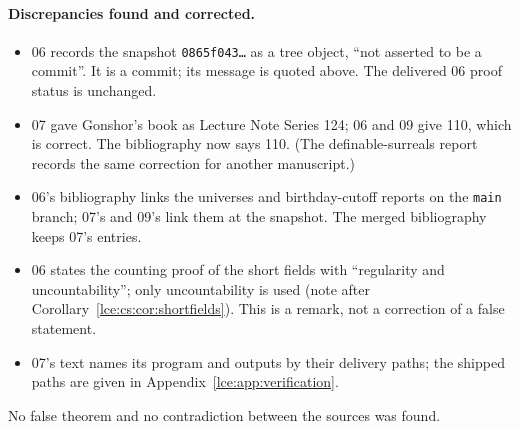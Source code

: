 \documentclass[11pt,letterpaper]{article}
\numberwithin{equation}{section}
\theoremstyle{definition}
\theoremstyle{remark}
\begin{document}
\paragraph{Discrepancies found and corrected.}
\begin{itemize}
\item 06 records the snapshot \texttt{0865f043\ldots} as a tree object, ``not
asserted to be a commit''. It is a commit; its message is quoted above. The
delivered 06 proof status is unchanged.
\item 07 gave Gonshor's book as Lecture Note Series 124; 06 and 09 give 110,
which is correct. The bibliography now says 110. (The definable-surreals
report records the same correction for another manuscript.)
\item 06's bibliography links the universes and birthday-cutoff reports on
the \texttt{main} branch; 07's and 09's link them at the snapshot. The
merged bibliography keeps 07's entries.
\item 06 states the counting proof of the short fields with ``regularity and
uncountability''; only uncountability is used (note after
Corollary~\ref{lce:cs:cor:shortfields}). This is a remark, not a correction
of a false statement.
\item 07's text names its program and outputs by their delivery paths; the
shipped paths are given in Appendix~\ref{lce:app:verification}.
\end{itemize}
No false theorem and no contradiction between the sources was found.
\end{document}
